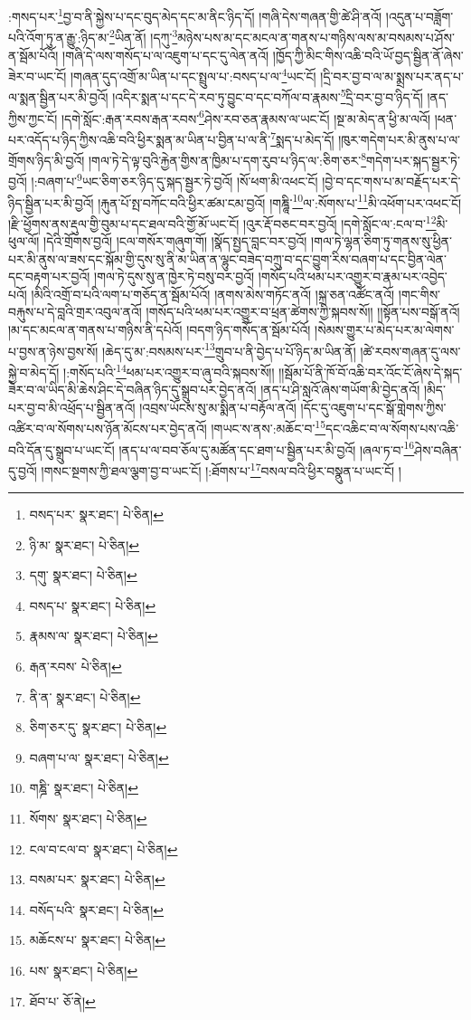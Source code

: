 :གསད་པར་\footnote{བསད་པར་  སྣར་ཐང་།  པེ་ཅིན། }བྱ་བ་ནི་སྐྱེས་པ་དང་བུད་མེད་དང་མ་ནིང་ཉིད་དོ། །གཞི་དེས་གཞན་གྱི་ཚེ་ཤི་ནའོ། །འདུན་པ་བཟློག་པའི་འོག་ཏུ་ན་རྒྱུ་:ཉིད་མ་\footnote{ཉི་མ་  སྣར་ཐང་།  པེ་ཅིན། }ཡིན་ནོ། །དཀུ་\footnote{དགུ་  སྣར་ཐང་།  པེ་ཅིན། }མཉེས་པས་མ་དང་མངལ་ན་གནས་པ་གཉིས་ལས་མ་བསམས་པ་ཤོས་ན་སྦོམ་པོའོ། །གཞི་དེ་ལས་གསོད་པ་ལ་འཇུག་པ་དང་དུ་ལེན་ནའོ། །ཁྱོད་ཀྱི་མིང་གིས་འཆི་བའི་ཡོ་བྱད་སྦྱིན་ནོ་ཞེས་ཟེར་བ་ཡང་ངོ། །གཞན་དུད་འགྲོ་མ་ཡིན་པ་དང་སྤྲུལ་པ་:བསད་པ་ལ་\footnote{བསད་པ་  སྣར་ཐང་།  པེ་ཅིན། }ཡང་ངོ། །དྲི་བར་བྱ་བ་ལ་མ་སྨྲས་པར་ནད་པ་ལ་སྨན་སྦྱིན་པར་མི་བྱའོ། །འདིར་སྨན་པ་དང་དེ་རབ་ཏུ་བྱུང་བ་དང་བཀོལ་བ་རྣམས་\footnote{རྣམས་ལ་  སྣར་ཐང་།  པེ་ཅིན། }དྲི་བར་བྱ་བ་ཉིད་དོ། །ནད་ཀྱིས་ཀྱང་ངོ། །དགེ་སློང་:རྒན་རབས་རྒན་རབས་\footnote{རྒན་རབས་  པེ་ཅིན། }ཤེས་རབ་ཅན་རྣམས་ལ་ཡང་ངོ། །སྔ་མ་མེད་ན་ཕྱི་མ་ལའོ། །ཕན་པར་འདོད་པ་ཉིད་ཀྱིས་འཆི་བའི་ཕྱིར་སྨན་མ་ཡིན་པ་བྱིན་པ་ལ་ནི་\footnote{ནི་ན་  སྣར་ཐང་།  པེ་ཅིན། }སྨད་པ་མེད་དོ། །ཁུར་གདེག་པར་མི་ནུས་པ་ལ་གྲོགས་ཉིད་མི་བྱའོ། །གལ་ཏེ་དེ་ལྟ་བུའི་རྐྱེན་གྱིས་ན་ཁྱིམ་པ་དག་རུབ་པ་ཉིད་ལ་:ཅིག་ཅར་\footnote{ཅིག་ཅར་དུ་  སྣར་ཐང་།  པེ་ཅིན། }གདེག་པར་སྐད་སྦྱར་ཏེ་བྱའོ། །:བཞག་པ་\footnote{བཞག་པ་ལ་  སྣར་ཐང་།  པེ་ཅིན། }ཡང་ཅིག་ཅར་ཉིད་དུ་སྐད་སྦྱར་ཏེ་བྱའོ། །སོ་ཕག་མི་འཕང་ངོ། །བྱེ་བ་དང་གས་པ་མ་བརྗོད་པར་དེ་ཉིད་སྦྱིན་པར་མི་བྱའོ། །རྐུན་པོ་སྤ་བཀོང་བའི་ཕྱིར་ཚམ་ངམ་བྱའོ། །གཎྜཱི་\footnote{གཎྜི་  སྣར་ཐང་།  པེ་ཅིན། }ལ་:སོགས་པ་\footnote{སོགས་  སྣར་ཐང་།  པེ་ཅིན། }མི་འཕོག་པར་འཕང་ངོ། །རྫི་ཕྱོགས་ནས་རྡུལ་གྱི་བུམ་པ་དང་ཐལ་བའི་གྱོ་མོ་ཡང་ངོ། །འུར་རྡོ་བཅང་བར་བྱའོ། །དགེ་སློང་ལ་:ངལ་བ་\footnote{ངལ་བ་ངལ་བ་  སྣར་ཐང་།  པེ་ཅིན། }མི་ཕུལ་ལོ། །དེའི་གྲོགས་བྱའོ། །ངལ་གསོར་གཞུག་གོ། །སྣོད་སྤྱད་བླང་བར་བྱའོ། །གལ་ཏེ་ལྷན་ཅིག་ཏུ་གནས་སུ་ཕྱིན་པར་མི་ནུས་ལ་ཟས་དང་སྐོམ་གྱི་དུས་སུ་ནི་མ་ཡིན་ན་ལྷུང་བཟེད་བཀྲུ་བ་དང་བྱུག་རིས་བཞག་པ་དང་བྱིན་ལེན་དང་བརྟག་པར་བྱའོ། །གལ་ཏེ་དུས་སུ་ན་ཁྱེར་ཏེ་བསུ་བར་བྱའོ། །གསོད་པའི་ཕམ་པར་འགྱུར་བ་རྣམ་པར་འབྱེད་པའོ། །མིའི་འགྲོ་བ་པའི་ལག་པ་གཅོད་ན་སྦོམ་པོའོ། །ནགས་མེས་གཏོང་ནའོ། །སྐྲ་ཅན་འཚོང་ནའོ། །གང་གིས་བརྐུས་པ་དེ་བླའི་གྲར་འབུལ་ནའོ། །གསོད་པའི་ཕམ་པར་འགྱུར་བ་ཕྲན་ཚེགས་ཀྱི་སྐབས་སོ།། །།སྟོན་པས་བསྒོ་ནའོ། །མ་དང་མངལ་ན་གནས་པ་གཉིས་ནི་དཔེའོ། །བདག་ཉིད་གསོད་ན་སྦོམ་པོའོ། །སེམས་གྱུར་པ་མེད་པར་མ་ལེགས་པ་བྱས་ན་ཉེས་བྱས་སོ། །ཆེད་དུ་མ་:བསམས་པར་\footnote{བསམ་པར་  སྣར་ཐང་།  པེ་ཅིན། }གྲུབ་པ་ནི་བྱེད་པ་པོ་ཉིད་མ་ཡིན་ནོ། །ཚེ་རབས་གཞན་དུ་ལས་སྐྱེ་བ་མེད་དོ། །:གསོད་པའི་\footnote{བསོད་པའི་  སྣར་ཐང་།  པེ་ཅིན། }ཕམ་པར་འགྱུར་བ་ཞུ་བའི་སྐབས་སོ།། །།སྦོམ་པོ་ནི་ཁོ་བོ་འཆི་བར་འོང་ངོ་ཞེས་དེ་སྐད་ཟེར་བ་ལ་ཡིད་མི་ཆེས་ཤིང་དེ་བཞིན་ཉིད་དུ་སྒྲུབ་པར་བྱེད་ནའོ། །ནད་པ་ཤི་སླའོ་ཞེས་གཡོག་མི་བྱེད་ནའོ། །མིད་པར་བྱ་བ་མི་འཕྲོད་པ་སྦྱིན་ནའོ། །འབྲས་ཡོངས་སུ་མ་སྨིན་པ་བརྟོལ་ནའོ། །དོང་དུ་འཇུག་པ་དང་སྒོ་གླེགས་ཀྱིས་འཚིར་བ་ལ་སོགས་པས་ཉོན་མོངས་པར་བྱེད་ནའོ། །གཡང་ས་ནས་:མཆོང་བ་\footnote{མཆོངས་པ་  སྣར་ཐང་།  པེ་ཅིན། }དང་འཆིང་བ་ལ་སོགས་པས་འཆི་བའི་དོན་དུ་སྒྲུབ་པ་ཡང་ངོ། །ནད་པ་ལ་བབ་ཅོལ་དུ་མཚོན་དང་ཐག་པ་སྦྱིན་པར་མི་བྱའོ། །ཞལ་ཏ་བ་\footnote{པས་  སྣར་ཐང་།  པེ་ཅིན། }ཤེས་བཞིན་དུ་བྱའོ། །གསང་སྔགས་ཀྱི་ཐལ་ལྕག་བྱ་བ་ཡང་ངོ། །:ཐོགས་པ་\footnote{ཐོབ་པ་  ཅོ་ནེ། }བསལ་བའི་ཕྱིར་བསྣུན་པ་ཡང་ངོ། །
